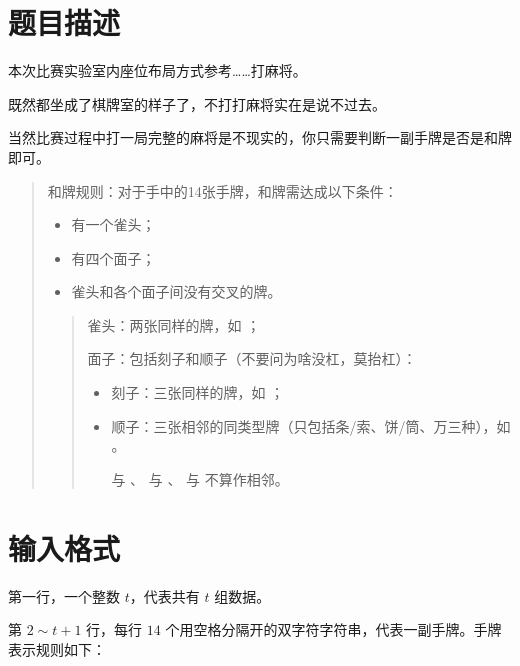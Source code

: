 \documentclass{../cpct/ctpro}
\begin{document}
\section*{题目描述}

本次比赛实验室内座位布局方式参考……打麻将。

既然都坐成了棋牌室的样子了，不打打麻将实在是说不过去。

当然比赛过程中打一局完整的麻将是不现实的，你只需要判断一副手牌是否是和牌即可。

\begin{quote}
    \hspace{0.15cm} 和牌规则：对于手中的14张手牌，和牌需达成以下条件：

    \begin{itemize}
        \item 有一个雀头；
        \item 有四个面子；
        \item 雀头和各个面子间没有交叉的牌。
    \end{itemize}

    \begin{quote}
        雀头：两张同样的牌，如  ；

        面子：包括刻子和顺子（不要问为啥没杠，莫抬杠）：

        \begin{itemize}
            \item 刻子：三张同样的牌，如   ；
            \item 顺子：三张相邻的同类型牌（只包括条/索、饼/筒、万三种），如   。

                  \begin{remark}
                       与 、 与 、 与  不算作相邻。
                  \end{remark}
        \end{itemize}
    \end{quote}
\end{quote}

\section*{输入格式}

第一行，一个整数 $t$，代表共有 $t$ 组数据。

第 $2 \sim t+1$ 行，每行 $14$ 个用空格分隔开的双字符字符串，代表一副手牌。手牌表示规则如下：
\end{document}
